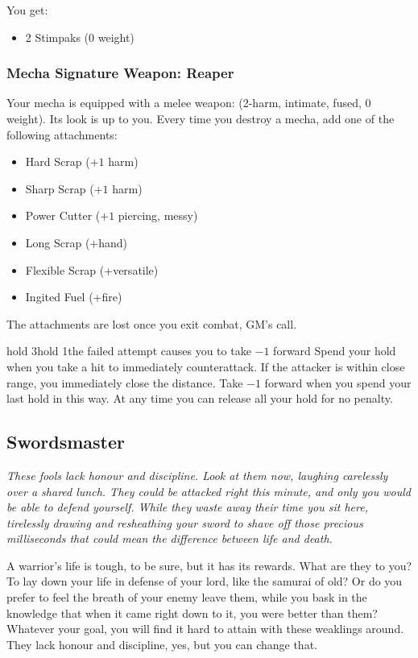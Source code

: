 You get:
\begin{itemize}
\item 2 Stimpaks (0 weight)
\end{itemize}

\subsubsection{Mecha Signature Weapon: Reaper}
Your mecha is equipped with a melee weapon: (2-harm, intimate, fused, 0 weight). Its look is up to you.
Every time you destroy a mecha, add one of the following attachments:
\begin{itemize}
\item Hard Scrap ($+1$ harm)
\item Sharp Scrap ($+1$ harm)
\item Power Cutter ($+1$ piercing, messy)
\item Long Scrap (+hand)
\item Flexible Scrap (+versatile)
\item Ingited Fuel (+fire)
\end{itemize}
The attachments are lost once you exit combat, GM's call.

{hold 3}{hold 1}{the failed attempt causes you to take $-1$ forward}
Spend your hold when you take a hit to immediately counterattack. If the attacker is within close range, you immediately close the distance. Take $-1$ forward when you spend your last hold in this way. At any time you can release all your hold for no penalty.



\subsection{Swordsmaster}
{\itshape These fools lack honour and discipline. Look at them now,
  laughing carelessly over a shared lunch. They could be attacked
  right this minute, and only you would be able to defend
  yourself. While they waste away their time you sit here, tirelessly
  drawing and resheathing your sword to shave off those precious
  milliseconds that could mean the difference between life and death.

A warrior's life is tough, to be sure, but it has its rewards. What
are they to you? To lay down your life in defense of your lord, like
the samurai of old? Or do you prefer to feel the breath of your enemy
leave them, while you bask in the knowledge that when it came right
down to it, you were better than them? Whatever your goal, you will
find it hard to attain with these weaklings around. They lack honour
and discipline, yes, but you can change that.}

